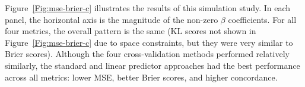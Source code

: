 
\par Figure~\ref{Fig:mse-brier-c} illustrates the results of this simulation study. In each panel, the horizontal axis is the magnitude of the non-zero $\beta$ coefficients.  For all four metrics, the overall pattern is the same (KL scores not shown in Figure~\ref{Fig:mse-brier-c} due to space constraints, but they were very similar to Brier scores).  Although the four cross-validation methods performed relatively similarly, the standard and linear predictor approaches had the best performance across all metrics: lower MSE, better Brier scores, and higher concordance.
 
